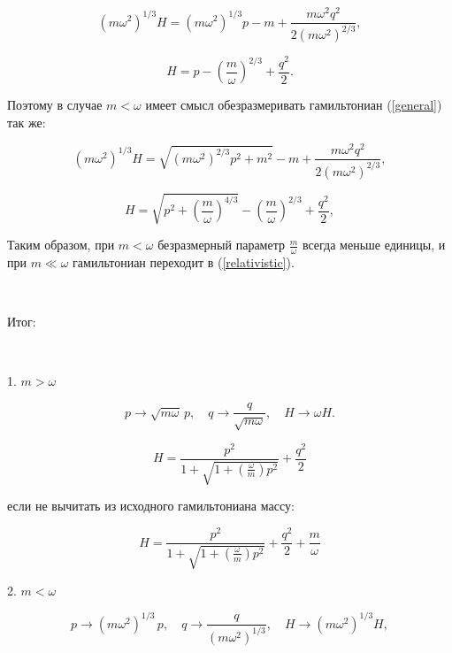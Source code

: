 \documentclass[12pt,a4paper,oneside]{article}
\begin{document}
\begin{equation}
(m\omega^2)^{1/3} H = (m\omega^2)^{1/3} p - m + \dfrac{m\omega^2 q^2}{2(m\omega^2)^{2/3}},
\end{equation}

\begin{equation}\label{relativistic}
H = p - \left(\dfrac{m}{\omega}\right)^{2/3} + \dfrac{q^2}{2}.
\end{equation}

Поэтому в случае $m < \omega$ имеет смысл обезразмеривать гамильтониан (\ref{general}) так же:

\begin{equation}
(m\omega^2)^{1/3} H = \sqrt{(m\omega^2)^{2/3} p^2 + m^2} - m + \dfrac{m\omega^2 q^2}{2 (m\omega^2)^{2/3}},
\end{equation}

\begin{equation}
 H = \sqrt{p^2 + \left(\frac{m}{\omega} \right)^{4/3}} - \left(\frac{m}{\omega} \right)^{2/3}  + \dfrac{q^2}{2},
\end{equation}

Таким образом, при $m < \omega$ безразмерный параметр $\frac{m}{\omega}$ всегда меньше единицы, и при $m \ll \omega$ гамильтониан переходит в (\ref{relativistic}). 


\

Итог:

\

1. $m > \omega$

\begin{equation}
p \to \sqrt{m\omega} \, p, \quad q \to \frac{q}{\sqrt{m\omega}}, \quad H \to \omega H.
\end{equation}

\begin{equation}\label{largemass}
H =  \dfrac{ p^2 }{ 1 + \sqrt{1 + \left(\frac{\omega}{m}\right) p^2}} + \dfrac{q^2}{2}
\end{equation}

если не вычитать из исходного гамильтониана  массу:

\begin{equation}\label{largemass}
H =  \dfrac{ p^2 }{ 1 + \sqrt{1 + \left(\frac{\omega}{m}\right) p^2}} + \dfrac{q^2}{2} + \dfrac{m}{\omega}
\end{equation}

2. $m < \omega$

\begin{equation}
p \to (m\omega^2)^{1/3}\, p, \quad q \to \frac{q}{(m\omega^2)^{1/3}}, \quad H \to (m\omega^2)^{1/3}  H,
\end{equation}
\end{document}
